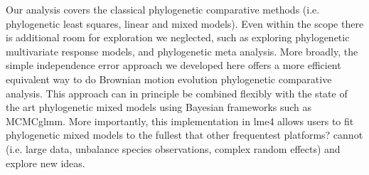 Our analysis covers the classical phylogenetic comparative methods (i.e. phylogenetic least squares, linear and mixed models).
Even within the scope there is additional room for exploration we neglected, such as exploring phylogenetic multivariate response models, and phylogenetic meta analysis.
More broadly, the simple independence error approach we developed here offers a more efficient equivalent way to do Brownian motion evolution phylogenetic comparative analysis. 
This approach can in principle be combined flexibly with the state of the art phylogenetic mixed models using Bayesian frameworks such as MCMCglmm. 
More importantly, this implementation in lme4 allows users to fit phylogenetic mixed models to the fullest that other frequentest platforms? cannot (i.e. large data, unbalance species observations, complex random effects) and explore new ideas.

